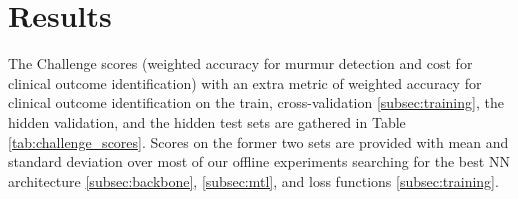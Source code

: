 \section{Results}
\label{sec:results}

The Challenge scores (weighted accuracy for murmur detection and cost for clinical outcome identification) with an extra metric of weighted accuracy for clinical outcome identification on the train, cross-validation \ref{subsec:training}, the hidden validation, and the hidden test sets are gathered in Table \ref{tab:challenge_scores}. Scores on the former two sets are provided with mean and standard deviation over most of our offline experiments searching for the best NN architecture \ref{subsec:backbone}, \ref{subsec:mtl}, and loss functions \ref{subsec:training}.


% 
